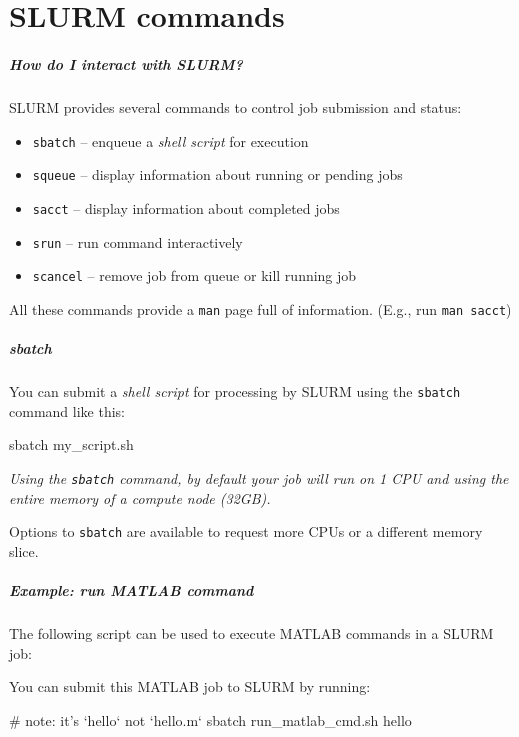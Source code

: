\documentclass[english,serif,mathserif,usenames,dvipsnames]{beamer}
\begin{document}
\part{SLURM commands}
\begin{frame}
  \frametitle{How do I interact with SLURM?}

  SLURM provides several commands to control job submission and
  status:
  \begin{itemize}
  \item \texttt{sbatch} -- enqueue a \emph{shell script} for execution
  \item \texttt{squeue} -- display information about running or pending jobs
  \item \texttt{sacct} -- display information about completed jobs
  \item \texttt{srun} -- run command interactively
  \item \texttt{scancel} -- remove job from queue or kill running job
  \end{itemize}

  \+
  All these commands provide a \texttt{man} page full of information.
  (E.g., run \texttt{man sacct})
\end{frame}


\begin{frame}[fragile]
  \frametitle{sbatch}

  You can submit a \emph{shell script} for processing by SLURM using
  the \texttt{sbatch} command like this:

\begin{sh}
  sbatch my_script.sh
\end{sh}

\+
  {\em Using the \texttt{sbatch} command, by default your job will run on 1
  CPU and using the entire memory of a compute node (32GB).}

\+
  Options to \texttt{sbatch} are available to request more CPUs or a
  different memory slice.
\end{frame}


\begin{frame}[fragile]
  \frametitle{Example: run MATLAB command}

  The following script can be used to execute MATLAB commands in a SLURM job:
  

  \+
  You can submit this MATLAB job to SLURM by running:

\begin{sh}
    # note: it's `hello` not `hello.m`
    sbatch run_matlab_cmd.sh hello
\end{sh}
\end{frame}
\end{document}
